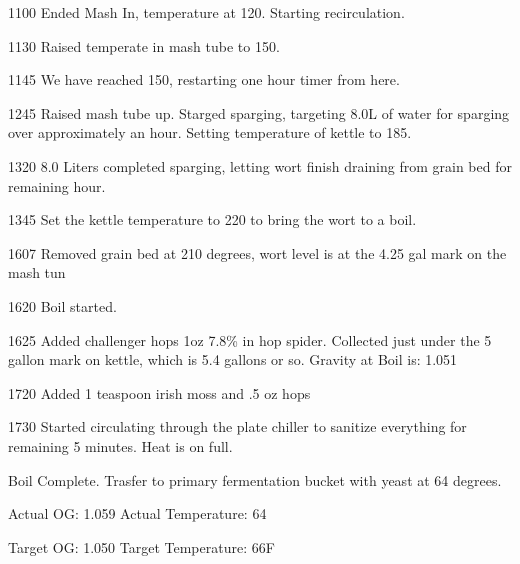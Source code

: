 1100 Ended Mash In, temperature at 120.  Starting recirculation.

1130 Raised temperate in mash tube to 150.  

1145 We have reached 150, restarting one hour timer from here.

1245 Raised mash tube up. Starged sparging, targeting 8.0L of water for sparging over approximately an hour.  Setting temperature of kettle to 185.

1320 8.0 Liters completed sparging, letting wort finish draining from grain bed for remaining hour.

1345 Set the kettle temperature to 220 to bring the wort to a boil.

1607 Removed grain bed at 210 degrees, wort level is at the 4.25 gal mark on the mash tun

1620 Boil started.

1625 Added challenger hops 1oz 7.8\% in hop spider.  Collected just under the 5 gallon mark on kettle, which is 5.4 gallons or so.  Gravity at Boil is: 1.051

1720 Added 1 teaspoon irish moss and .5 oz hops

1730 Started circulating through the plate chiller to sanitize everything for remaining 5 minutes.  Heat is on full.

Boil Complete.  Trasfer to primary fermentation bucket with yeast at 64 degrees.

Actual OG: 1.059
Actual Temperature: 64

Target OG: 1.050
Target Temperature: 66F
